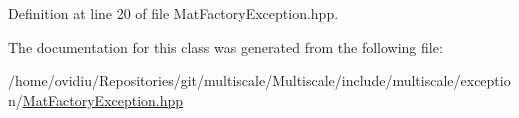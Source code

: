 Definition at line 20 of file Mat\-Factory\-Exception.\-hpp.



The documentation for this class was generated from the following file\-:\begin{DoxyCompactItemize}
\item 
/home/ovidiu/\-Repositories/git/multiscale/\-Multiscale/include/multiscale/exception/\hyperlink{MatFactoryException_8hpp}{Mat\-Factory\-Exception.\-hpp}\end{DoxyCompactItemize}
